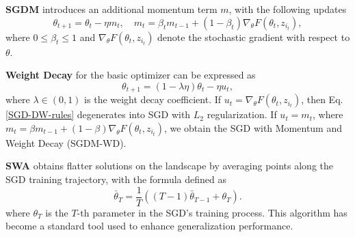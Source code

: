 \textbf{SGDM} introduces an additional momentum term $m$, with the following updates
\begin{equation}\label{SGDM-rules}
\theta_{t+1} = \theta_{t} - \eta m_{t}, \quad m_{t} = \beta_{t} m_{t-1} + (1 - \beta_t) \nabla_{\theta} F(\theta_t, z_{i_t}),
\end{equation} 
where $0 \leq \beta_t \leq 1$ and $\nabla_{\theta} F(\theta_t, z_{i_t})$ denote the stochastic gradient with respect to $\theta$.

\textbf{Weight Decay} for the basic optimizer can be expressed as
\begin{equation}\label{SGD-DW-rules}
   \theta_{t+1} = (1-\lambda\eta)\theta_{t} - \eta u_t,
\end{equation} 
where $\lambda \in (0,1)$ is the weight decay coefficient. If $u_t = \nabla_\theta F(\theta_{t},z_{i_t})$, then Eq. \ref{SGD-DW-rules} degenerates into SGD with $L_2$ regularization. If $u_t =m_t$, where $m_t=\beta m_{t-1}+(1-\beta)\nabla_\theta F(\theta_{t},z_{i_t})$, we obtain the SGD with Momentum and Weight Decay (SGDM-WD).

\textbf{SWA} obtains flatter solutions on the landscape by averaging points along the SGD training trajectory, with the formula defined as  
\begin{equation}\label{SWA*-rules}
    \bar{\theta}_{T}=\frac{1}{T} ((T-1)\bar{\theta}_{T-1} +\theta_{T}).
\end{equation}
where $\theta_T$ is the $T$-th parameter in the SGD's training process. This algorithm \cite{izmailov2018averaging} has become a standard tool used to enhance generalization performance.





